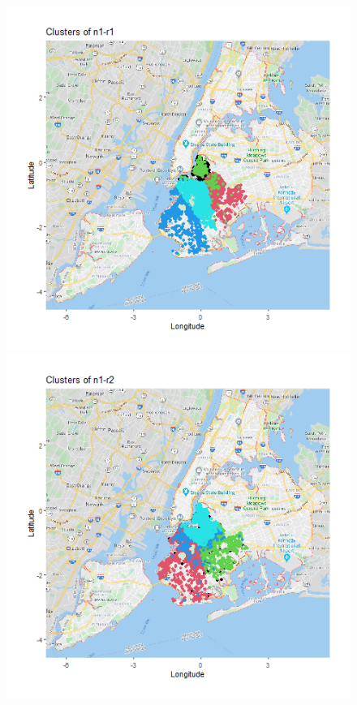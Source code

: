 \documentclass{FR16}
\begin{document}
\newpage
\begin{figure}[!htb]
   \begin{minipage}{0.33\textwidth}
     \centering
     \includegraphics[width=1\linewidth]{figures/clust-n1-r1.png} 
   \end{minipage}\hfill
   \begin{minipage}{0.33\textwidth}
     \centering
     \includegraphics[width=1\linewidth]{figures/clust-n1-r2.png}

\end{minipage}
\end{figure}
\end{document}
